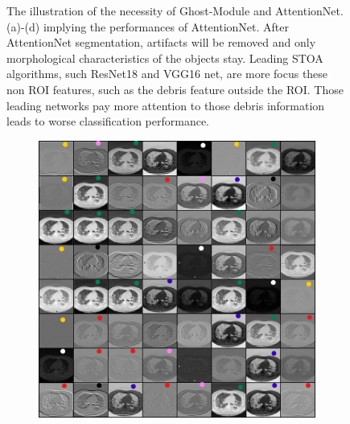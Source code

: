 \begin{figure}[t]
\begin{center}
\begin{subfigure}[b]{0.33\textwidth}
			\caption{}
			\label{fig:cellnet}
		\end{subfigure}
	\end{center}
	\caption{The illustration of the necessity of Ghost-Module and AttentionNet. (a)-(d) implying the performances of AttentionNet. After AttentionNet segmentation, artifacts will be removed and only morphological characteristics of the objects stay. Leading  STOA  algorithms, such ResNet18 and VGG16 net, are  more focus  these  non  ROI  features,  such  as  the  debris  feature  outside the ROI. Those leading networks pay more attention to those debris information leads to worse classification performance.}
\end{figure}

\begin{figure}[t]
	\begin{center}
		\begin{subfigure}[b]{0.33\textwidth}
			\includegraphics[height= 0.20\textheight]{thesis-template-master/images/Inkedfirst Conv1 of resnet18 with pretrain weights on coviddataset_LI.jpg}
			\caption{}
			\label{fig:res18}
		\end{subfigure}
		\begin{subfigure}[b]{0.33\textwidth}

\end{subfigure}
\end{center}
\end{figure}
